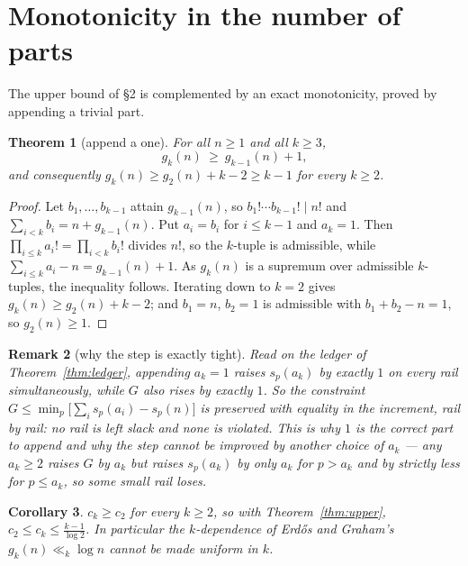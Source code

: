 \documentclass[11pt]{article}
\newtheorem{theorem}{Theorem}
\newtheorem{corollary}[theorem]{Corollary}
\newtheorem{remark}[theorem]{Remark}
\begin{document}
\section{Monotonicity in the number of parts}

The upper bound of \S2 is complemented by an exact monotonicity, proved by appending a
trivial part.

\begin{theorem}[append a one]\label{thm:append}
For all $n\ge1$ and all $k\ge3$,
\[
  g_k(n)\ \ge\ g_{k-1}(n)+1 ,
\]
and consequently $g_k(n)\ge g_2(n)+k-2\ge k-1$ for every $k\ge2$.
\end{theorem}

\begin{proof}
Let $b_1,\dots,b_{k-1}$ attain $g_{k-1}(n)$, so $b_1!\cdots b_{k-1}!\mid n!$ and
$\sum_{i<k}b_i=n+g_{k-1}(n)$.  Put $a_i=b_i$ for $i\le k-1$ and $a_k=1$.  Then
$\prod_{i\le k}a_i!=\prod_{i<k}b_i!$ divides $n!$, so the $k$-tuple is admissible, while
$\sum_{i\le k}a_i-n=g_{k-1}(n)+1$.  As $g_k(n)$ is a supremum over admissible $k$-tuples,
the inequality follows.  Iterating down to $k=2$ gives $g_k(n)\ge g_2(n)+k-2$; and
$b_1=n$, $b_2=1$ is admissible with $b_1+b_2-n=1$, so $g_2(n)\ge1$.
\end{proof}

\begin{remark}[why the step is exactly tight]\label{rem:tight}
Read on the ledger of Theorem~\ref{thm:ledger}, appending $a_k=1$ raises $s_p(a_k)$ by
exactly $1$ on \emph{every} rail simultaneously, while $G$ also rises by exactly $1$.  So
the constraint $G\le\min_p\bigl[\sum_is_p(a_i)-s_p(n)\bigr]$ is preserved with equality in
the increment, rail by rail: no rail is left slack and none is violated.  This is why $1$
is the correct part to append and why the step cannot be improved by another choice of
$a_k$ --- any $a_k\ge2$ raises $G$ by $a_k$ but raises $s_p(a_k)$ by only $a_k$ for
$p>a_k$ and by strictly less for $p\le a_k$, so some small rail loses.
\end{remark}

\begin{corollary}\label{cor:ck}
$c_k\ge c_2$ for every $k\ge2$, so with Theorem~\ref{thm:upper},
$c_2\le c_k\le\frac{k-1}{\log2}$.  In particular the $k$-dependence of Erd\H{o}s and
Graham's $g_k(n)\ll_k\log n$ cannot be made uniform in $k$.
\end{corollary}
\end{document}

